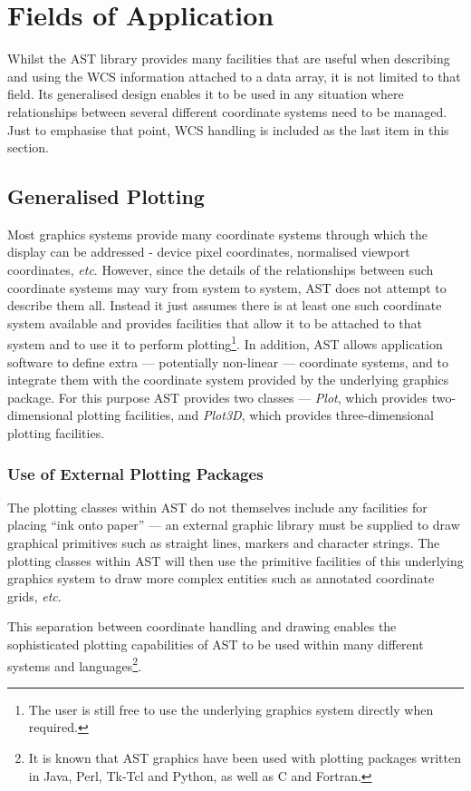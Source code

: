 \documentclass[final,authoryear,5p,times,twocolumn]{elsarticle}
\begin{document}
\section{Fields of Application}
Whilst the AST library provides many facilities that are useful when
describing and using the WCS information attached to a data array, it
is not limited to that field. Its generalised design enables it to be used
in any situation where relationships between several different coordinate
systems need to be managed. Just to emphasise that point, WCS handling is
included as the last item in this section.

\subsection{Generalised Plotting}
\label{sec:plotting}
Most graphics systems provide many coordinate systems through which the
display can be addressed - device pixel coordinates, normalised viewport
coordinates, \emph{etc}. However, since the details of the relationships
between such coordinate systems may vary from system to system, AST does
not attempt to describe them all. Instead it just assumes there is at
least one such coordinate system available and provides facilities that
allow it to be attached to that system and to use it to perform
plotting\footnote{The user is still free to use the underlying graphics
system directly when required.}. In addition, AST allows application
software to define extra --- potentially non-linear --- coordinate
systems, and to integrate them with the coordinate system provided by the
underlying graphics package. For this purpose AST provides two classes ---
\emph{Plot}, which provides two-dimensional plotting facilities, and
\emph{Plot3D}, which provides three-dimensional plotting facilities.

\subsubsection{Use of External Plotting Packages}
The plotting classes within AST do not themselves include any facilities
for placing ``ink onto paper'' --- an external graphic library must be
supplied to draw graphical primitives such as straight lines, markers and
character strings. The plotting classes within AST will then use the
primitive facilities of this underlying graphics system to draw more complex
entities such as annotated coordinate grids, \emph{etc}.

This separation between coordinate handling and drawing enables the
sophisticated plotting capabilities of AST to be used within many
different systems and languages\footnote{It is known that AST graphics
have been used with plotting packages written in Java, Perl, Tk-Tcl and
Python, as well as C and Fortran.}.
\end{document}
